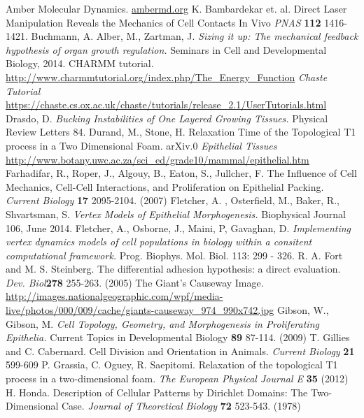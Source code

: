 \begin{thebibliography}{1}
 Amber Molecular Dynamics. \url{ambermd.org}
 K. Bambardekar et. al. Direct Laser Manipulation Reveals the Mechanics of Cell Contacts In Vivo \emph{PNAS} \textbf{112} 1416-1421.
 Buchmann, A. Alber, M., Zartman, J. \emph{ Sizing it up: The mechanical feedback hypothesis of organ growth regulation.} Seminars in Cell and Developmental Biology, 2014.
 CHARMM tutorial. \url{http://www.charmmtutorial.org/index.php/The_Energy_Function}
 \emph{Chaste Tutorial} \url{https://chaste.cs.ox.ac.uk/chaste/tutorials/release_2.1/UserTutorials.html}
 Drasdo, D. \emph{Bucking Instabilities of One Layered Growing Tissues.} Physical Review Letters 84.
 Durand, M., Stone, H. Relaxation Time of the Topological T1 process in a Two Dimensional Foam. arXiv.0
\emph{Epithelial Tissues} \url{http://www.botany.uwc.ac.za/sci_ed/grade10/mammal/epithelial.htm}
 Farhadifar, R., Roper, J., Algouy, B., Eaton, S., Jullcher, F. The Influence of Cell Mechanics, Cell-Cell Interactions, and Proliferation on Epithelial Packing. \emph{Current Biology} \textbf{17} 2095-2104. (2007) 
 Fletcher, A. , Osterfield, M., Baker, R., Shvartsman, S. \emph{Vertex Models of Epithelial Morphogenesis.} Biophysical Journal 106, June 2014.
 Fletcher, A., Osborne, J., Maini, P, Gavaghan, D. \emph{Implementing vertex dynamics models of cell populations in biology within a consitent computational framework.} Prog. Biophys. Mol. Biol. 113: 299 - 326.
 R. A. Fort and M. S. Steinberg. The differential adhesion hypothesis: a direct evaluation. \emph{Dev. Biol}\textbf{278} 255-263. (2005)
 The Giant's Causeway Image. \url{http://images.nationalgeographic.com/wpf/media-live/photos/000/009/cache/giants-causeway_974_990x742.jpg}
 Gibson, W., Gibson, M. \emph{Cell Topology, Geometry, and Morphogenesis  in Proliferating Epithelia.} Current Topics in Developmental Biology \textbf{89} 87-114. (2009)
 T. Gillies and C. Cabernard. Cell Division and Orientation in Animals. \emph{Current Biology} \textbf{21} 599-609
 P. Grassia, C. Oguey, R. Saepitomi. Relaxation of the topological T1 process in a two-dimensional foam. \emph{The European Physical Journal E} \textbf{35} (2012)
 H. Honda. Description of Cellular Patterns by Dirichlet Domains: The Two-Dimensional Case. \emph{Journal of Theoretical Biology} \textbf{72} 523-543. (1978)

\end{thebibliography}
